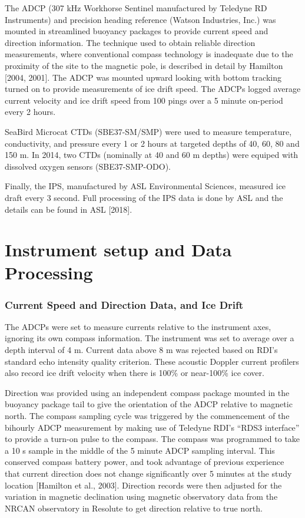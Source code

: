 \documentclass[12pt]{dforeport}
\begin{document}
The ADCP (307 kHz Workhorse Sentinel manufactured by Teledyne RD Instruments) and precision heading reference (Watson Industries, Inc.) was mounted in streamlined buoyancy packages to provide current speed and direction information.  The technique used to obtain reliable direction measurements, where conventional compass technology is inadequate due to the proximity of the site to the magnetic pole, is described in detail by Hamilton [2004, 2001]. The ADCP was mounted upward looking with bottom tracking turned on to provide measurements of ice drift speed. The ADCPs logged average current velocity and ice drift speed from 100 pings over a 5 minute on-period every 2 hours.

SeaBird Microcat CTDs (SBE37-SM/SMP) were used to measure temperature, conductivity, and pressure every 1 or 2 hours at targeted depths of 40, 60, 80 and 150 m. In 2014, two CTDs (nominally at 40 and 60 m depths) were equiped with dissolved oxygen sensors (SBE37-SMP-ODO).

Finally, the IPS, manufactured by ASL Environmental Sciences, measured ice draft every 3 second. Full processing of the IPS data is done by ASL and the details can be found in ASL [2018].

\section{Instrument setup and Data Processing}

\subsubsection{Current Speed and Direction Data, and Ice Drift}

The ADCPs were set to measure currents relative to the instrument axes, ignoring its own compass information.  The instrument was set to average over a depth interval of 4 m.  Current data above 8 m was rejected based on RDI's standard echo intensity quality criterion.  These acoustic Doppler current profilers also record ice drift velocity when there is 100\% or near-100\% ice cover.

Direction was provided using an independent compass package mounted in the buoyancy package tail to give the orientation of the ADCP relative to magnetic north.  The compass sampling cycle was triggered by the commencement of the bihourly ADCP measurement by making use of Teledyne RDI’s “RDS3 interface” to provide a turn-on pulse to the compass.  The compass was programmed to take a 10 s sample in the middle of the 5 minute ADCP sampling interval.  This conserved compass battery power, and took advantage of previous experience that current direction does not change significantly over 5 minutes at the study location [Hamilton et al., 2003].  Direction records were then adjusted for the variation in magnetic declination using magnetic observatory data from the NRCAN observatory in Resolute to get direction relative to true north. 
\end{document}
